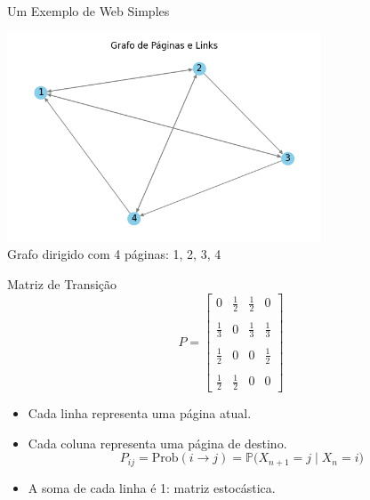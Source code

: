 \documentclass{beamer}
\begin{document}

\begin{frame}{Um Exemplo de Web Simples}
\begin{center}
\includegraphics[width=0.7\textwidth]{web_grafo.png} \\
Grafo dirigido com 4 páginas: 1, 2, 3, 4
\end{center}
\end{frame}


\begin{frame}{Matriz de Transição}
  \[
    P = \begin{bmatrix}
      0 & \frac{1}{2} & \frac{1}{2} & 0 \\\\
      \frac{1}{3} & 0 & \frac{1}{3} & \frac{1}{3} \\\\
      \frac{1}{2} & 0 & 0 & \frac{1}{2} \\\\
      \frac{1}{2} & \frac{1}{2} & 0 & 0
    \end{bmatrix}
  \]
  \begin{itemize}
  \item Cada linha representa uma página atual.
  \item Cada coluna representa uma página de destino.
      $$P_{ij} = \mathrm{Prob}(i\to j) = \mathbb{P} \big( X_{n+1} = j \mid X_n=i \big)$$
  \item A soma de cada linha é 1: matriz estocástica.
  \end{itemize}
  
  
\end{frame}

\end{document}
